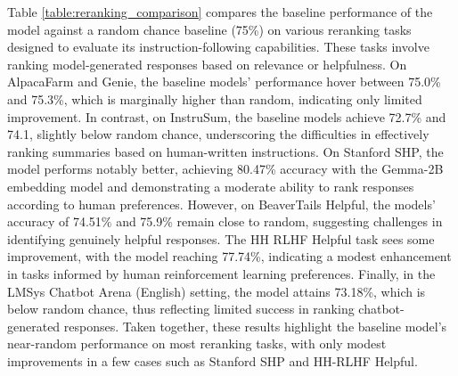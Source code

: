 \begin{table}[t!]
\vspace{-1em}
\centering
{}
\caption{Baseline performance on reranking for evaluating instruction-following.}
\label{table:reranking_comparison}
\vspace{-1em}
\end{table}

Table \ref{table:reranking_comparison} compares the baseline performance of the model against a random chance baseline (75\%) on various reranking tasks designed to evaluate its instruction-following capabilities. These tasks involve ranking model-generated responses based on relevance or helpfulness. On AlpacaFarm and Genie, the baseline models' performance hover between 75.0\% and 75.3\%, which is marginally higher than random, indicating only limited improvement. In contrast, on InstruSum, the baseline models achieve 72.7\% and 74.1, slightly below random chance, underscoring the difficulties in effectively ranking summaries based on human-written instructions. On Stanford SHP, the model performs notably better, achieving 80.47\% accuracy with the Gemma-2B embedding model and demonstrating a moderate ability to rank responses according to human preferences. However, on BeaverTails Helpful, the models' accuracy of 74.51\% and 75.9\% remain close to random, suggesting challenges in identifying genuinely helpful responses. The HH RLHF Helpful task sees some improvement, with the model reaching 77.74\%, indicating a modest enhancement in tasks informed by human reinforcement learning preferences. Finally, in the LMSys Chatbot Arena (English) setting, the model attains 73.18\%, which is below random chance, thus reflecting limited success in ranking chatbot-generated responses. Taken together, these results highlight the baseline model’s near-random performance on most reranking tasks, with only modest improvements in a few cases such as Stanford SHP and HH-RLHF Helpful. 

